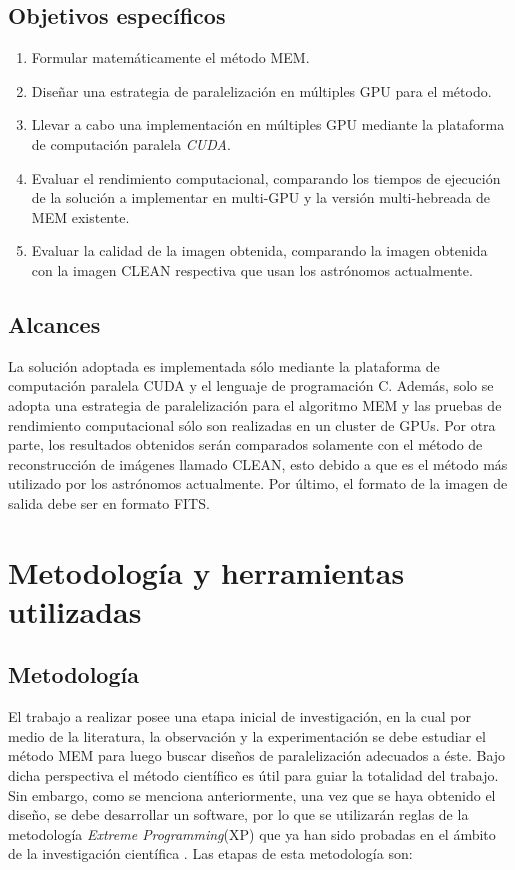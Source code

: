 \subsection{Objetivos espec\'ificos}

\begin{enumerate}
\item Formular matemáticamente el método MEM.
\item Diseñar una estrategia de paralelización en múltiples GPU para el método.
\item Llevar a cabo una implementación en múltiples GPU mediante la plataforma de computación paralela \textit{CUDA}.
\item Evaluar el rendimiento computacional, comparando los tiempos de ejecución de la solución a implementar en multi-GPU y la versión multi-hebreada de MEM existente.
\item Evaluar la calidad de la imagen obtenida, comparando la imagen obtenida con la imagen CLEAN respectiva que usan los astrónomos actualmente.
\end{enumerate}

\subsection{Alcances}
La solución adoptada es implementada sólo mediante la plataforma de computación paralela CUDA y el lenguaje de programación C. Además, solo se adopta una estrategia de paralelización  para el algoritmo MEM y las pruebas de rendimiento computacional sólo son realizadas en un cluster de GPUs. Por otra parte, los resultados obtenidos serán comparados solamente con el método de reconstrucción de imágenes llamado CLEAN, esto debido a que es el método más utilizado por los astrónomos actualmente. Por último, el formato de la imagen de salida debe ser en formato FITS. 


\section{Metodolog\'ia y herramientas utilizadas}
\label{intro:metodologia}

\subsection{Metodolog\'ia}
El trabajo a realizar posee una etapa inicial de investigación, en la cual por medio de la literatura, la observación y la experimentación se debe estudiar el método MEM  para luego buscar diseños de paralelización adecuados a éste. Bajo dicha perspectiva el método científico es útil para guiar la totalidad del trabajo. Sin embargo, como se menciona anteriormente, una vez que se haya obtenido el diseño, se debe desarrollar un software, por lo que se utilizarán reglas de la metodología \textit{Extreme Programming}(XP) que ya han sido probadas en el ámbito de la investigación científica \citep{xp}. Las etapas de esta metodología son:

